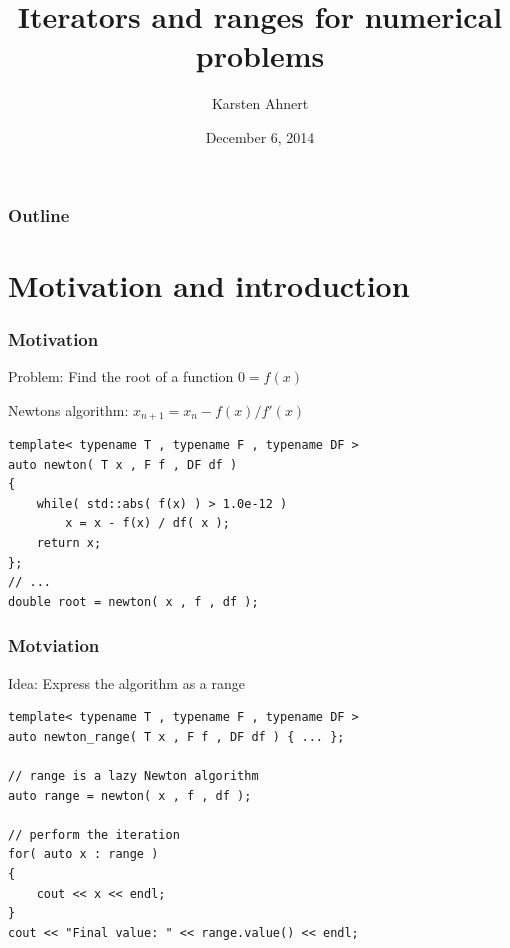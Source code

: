 \documentclass{beamer}
\title[Iteratorst]{Iterators and ranges for numerical problems}
\author[Karsten Ahnert]{Karsten Ahnert}
\institute[Ambrosys]{Ambrosys GmbH, Potsdam}
\date{December 6, 2014}
\newcommand{\heading}[1]{\frametitle{#1}}
\begin{document}
\frame{
  \titlepage


}



\begin{frame}
  \heading{Outline}

  \tableofcontents
\end{frame}



\section{Motivation and introduction}




\begin{frame}[fragile]
\heading{Motivation}

Problem: Find the root of a function \hspace{2ex} $0=f(x)$

\pause

\vspace{0.5ex}
Newtons algorithm: \hspace{2ex} $x_{n+1} = x_n - f(x)/f'(x)$

\pause

\vspace{2ex}
  \begin{lstlisting}[basicstyle=\scriptsize\ttfamily]
template< typename T , typename F , typename DF >
auto newton( T x , F f , DF df )
{
    while( std::abs( f(x) ) > 1.0e-12 )
        x = x - f(x) / df( x );
    return x;
};
// ...
double root = newton( x , f , df );
  \end{lstlisting}
\vspace{2ex}


\end{frame}


\begin{frame}[fragile]
 \heading{Motviation}
 

Idea: Express the algorithm as a range
\begin{lstlisting}[basicstyle=\scriptsize\ttfamily]
template< typename T , typename F , typename DF >
auto newton_range( T x , F f , DF df ) { ... };

// range is a lazy Newton algorithm
auto range = newton( x , f , df );   

// perform the iteration
for( auto x : range )
{
    cout << x << endl;
}
cout << "Final value: " << range.value() << endl;
\end{lstlisting}

\end{frame}
\end{document}
